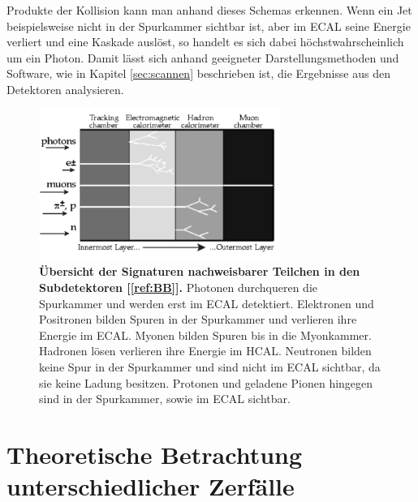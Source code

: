 \documentclass[a4paper,ngerman]{scrartcl}
\begin{document}
Produkte der Kollision kann man anhand dieses Schemas erkennen. 
Wenn ein Jet beispielsweise nicht in der Spurkammer sichtbar ist, aber im ECAL seine Energie verliert und eine Kaskade auslöst,
so handelt es sich dabei höchstwahrscheinlich um ein Photon.
Damit lässt sich anhand geeigneter Darstellungsmethoden und Software, wie in Kapitel \ref{sec:scannen} beschrieben ist, die Ergebnisse aus den Detektoren analysieren.

\begin{figure}[tbh!]
\centering
\includegraphics[width=0.7\textwidth]{abbildungen/delphi_schichten.png}
\caption{\textbf{Übersicht der Signaturen nachweisbarer Teilchen in den Subdetektoren [\ref{ref:BB}].} 
Photonen durchqueren die Spurkammer und werden erst im ECAL detektiert.
Elektronen und Positronen bilden Spuren in der Spurkammer und verlieren ihre Energie im ECAL.
Myonen bilden Spuren bis in die Myonkammer.
Hadronen lösen verlieren ihre Energie im HCAL.
Neutronen bilden keine Spur in der Spurkammer und sind nicht im ECAL sichtbar, da sie keine Ladung besitzen.
Protonen und geladene Pionen hingegen sind in der Spurkammer, sowie im ECAL sichtbar.
}
\label{fig:delphi_schichten}
\end{figure}


\section{Theoretische Betrachtung unterschiedlicher Zerfälle}
\label{sec:zerfaelle}
\end{document}
